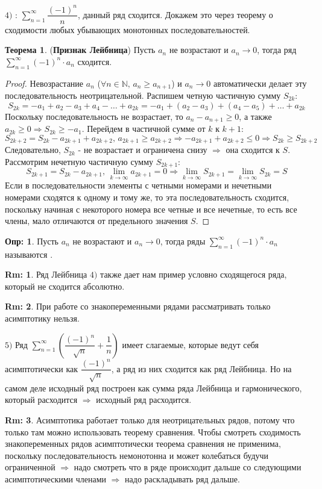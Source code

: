 \documentclass[12pt]{article}
\newcommand{\MN}{\mathbb{N}}
\theoremstyle{definition}
\newtheorem{defn}{Опр:}
\newtheorem{rem}{Rm:}
\newtheorem{theorem}{Теорема}
\begin{document}
$4)$ : $\displaystyle \sum\limits_{n = 1}^{\infty} \dfrac{(-1)^n}{n}$, данный ряд сходится. Докажем это через теорему о сходимости любых убывающих монотонных последовательностей.
\begin{theorem}(\textbf{Признак Лейбница})
	Пусть $a_n$ не возрастают и $a_n \to 0$, тогда ряд $\displaystyle \sum\limits_{n = 1}^{\infty}(-1)^n{\cdot}a_n$ сходится.
\end{theorem}
\begin{proof}
	Невозрастание $a_n$ ($\forall n \in \MN, \, a_n \geq a_{n+1}$) и $a_n \to 0$ автоматически делает эту последовательность неотрицательной. Распишем четную частичную сумму $S_{2k}$:
	$$
		S_{2k} = -a_1 + a_2 -a_3 + a_4 - \dotsc + a_{2k} = -a_1 + (a_2 - a_3) + (a_4 - a_5) + \dotsc + a_{2k}
	$$ 
	Поскольку последовательность не возрастает, то $a_n - a_{n+1} \geq 0$, а также $a_{2k} \geq 0 \Rightarrow S_{2k} \geq -a_1$. Перейдем в частичной сумме от $k$ к $k+1$:
	$$
		S_{2k + 2} = S_{2k} - a_{2k+1} + a_{2k + 2}, \, a_{2k+1} \geq a_{2k+2} \Rightarrow -a_{2k+1} + a_{2k + 2} \leq 0 \Rightarrow S_{2k} \geq S_{2k+2} 
	$$
	Следовательно, $S_{2k}$ - не возрастает и ограничена снизу $\Rightarrow$ она сходится к $S$. Рассмотрим нечетную частичную сумму $S_{2k+1}$:
	$$
		S_{2k+1} = S_{2k} - a_{2k+1}, \, \lim\limits_{k \to \infty} a_{2k+1} = 0 \Rightarrow \lim\limits_{k \to \infty} S_{2k+1} = \lim\limits_{k \to \infty} S_{2k} = S
	$$
	Если в последовательности элементы с четными номерами и нечетными номерами сходятся к одному и тому же, то эта последовательность сходится, поскольку начиная с некоторого номера все четные и все нечетные, то есть все члены, мало отличаются от предельного значения $S$.
\end{proof}
\begin{defn}
	Пусть $a_n$ не возрастают и $a_n \to 0$, тогда ряды $\displaystyle \sum\limits_{n = 1}^{\infty}(-1)^n{\cdot}a_n$ называются .
\end{defn}
\begin{rem}
	Ряд Лейбница $4)$ также дает нам пример условно сходящегося ряда, который не сходится абсолютно.
\end{rem}
\begin{rem}
	При работе со знакопеременными рядами рассматривать только асимптотику нельзя.
\end{rem}

$5)$ Ряд $\displaystyle \sum\limits_{n = 1}^{\infty} \left(\dfrac{(-1)^n}{\sqrt{n}} + \dfrac{1}{n}\right)$ имеет слагаемые, которые ведут себя асимптотически как $\dfrac{(-1)^n}{\sqrt{n}}$, а ряд из них сходится как ряд Лейбница. Но на самом деле исходный ряд построен как сумма ряда Лейбница и гармонического, который расходится $\Rightarrow$ исходный ряд расходится.

\begin{rem}
	Асимптотика работает только для неотрицательных рядов, потому что только там можно использовать теорему сравнения. Чтобы смотреть сходимость знакопеременных рядов асимптотически теорема сравнения не применима, поскольку последовательность немонотонна и может колебаться будучи ограниченной $\Rightarrow$ надо смотреть что в ряде происходит дальше со следующими асимптотическими членами $\Rightarrow$ надо раскладывать ряд дальше.
\end{rem}
\end{document}
